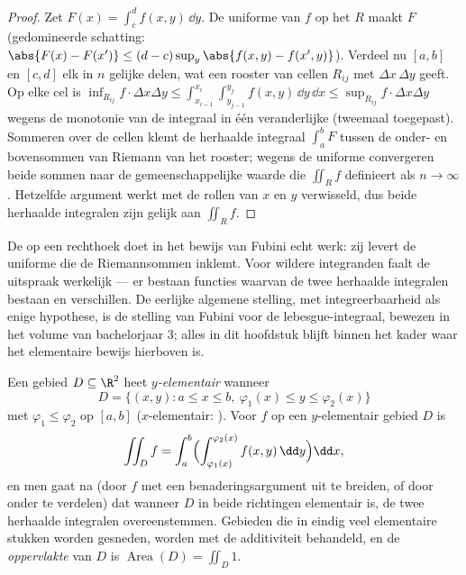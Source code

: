 \begin{proof}
Zet $F(x) = \int_c^d f(x, y)\,\dd y$. De uniforme  van
$f$ op het  $R$ maakt $F$  (gedomineerde schatting:
$\abs{F(x) - F(x')} \leq (d - c)\sup_y\abs{f(x,y) - f(x',y)}$).
Verdeel nu $[a,b]$ en $[c,d]$ elk in $n$ gelijke delen, wat een
rooster van cellen $R_{ij}$ met  $\Delta x\,\Delta y$
geeft. Op elke cel is $\inf_{R_{ij}} f \cdot \Delta x \Delta y \leq
\int_{x_{i-1}}^{x_i}\int_{y_{j-1}}^{y_j} f(x,y)\,\dd y\,\dd x \leq
\sup_{R_{ij}} f \cdot \Delta x \Delta y$ wegens de monotonie van de
integraal in één veranderlijke (tweemaal toegepast). Sommeren over
de cellen klemt de herhaalde integraal $\int_a^b F$ tussen de
onder- en bovensommen van Riemann van het rooster; wegens de
uniforme  convergeren beide sommen naar de
gemeenschappelijke waarde die $\iint_R f$ definieert als $n \to
\infty$. Hetzelfde argument werkt met de rollen van $x$ en $y$
verwisseld, dus beide herhaalde integralen zijn gelijk aan $\iint_R
f$.
\end{proof}

\begin{remark}
De  op een  rechthoek doet in het bewijs van
Fubini echt werk: zij levert de uniforme  die de
Riemannsommen inklemt. Voor wildere integranden faalt de uitspraak
werkelijk --- er bestaan functies waarvan de twee herhaalde
integralen bestaan en verschillen. De eerlijke algemene stelling,
met integreerbaarheid als enige hypothese, is de stelling van
Fubini voor de lebesgue-integraal, bewezen in het volume van
bachelorjaar 3; alles in dit hoofdstuk blijft binnen het 
kader waar het elementaire bewijs hierboven  is.
\end{remark}

\begin{definition}\label{def:b2:multint:domain}
Een gebied $D \subseteq \R^2$ heet \emph{$y$-elementair} wanneer
\[
D = \{(x, y) : a \leq x \leq b,\
\varphi_1(x) \leq y \leq \varphi_2(x)\}
\]
met $\varphi_1 \leq \varphi_2$  op $[a,b]$
($x$-elementair: \omterm{def:b2:quadratic:adjoint}{symmetrisch}). Voor $f$  op een
$y$-elementair gebied $D$ is
\[
\iint_D f
= \int_a^b\Bigl(
\int_{\varphi_1(x)}^{\varphi_2(x)} f(x,y)\,\dd y\Bigr)\dd x ,
\]
en men gaat na (door $f$ met een benaderingsargument uit te
breiden, of door onder te verdelen) dat wanneer $D$ in beide
richtingen elementair is, de twee herhaalde integralen
overeenstemmen. Gebieden die in eindig veel elementaire stukken
worden gesneden, worden met de additiviteit behandeld, en de
\emph{oppervlakte} van $D$
is $\operatorname{Area}(D) = \iint_D 1$.
\end{definition}

